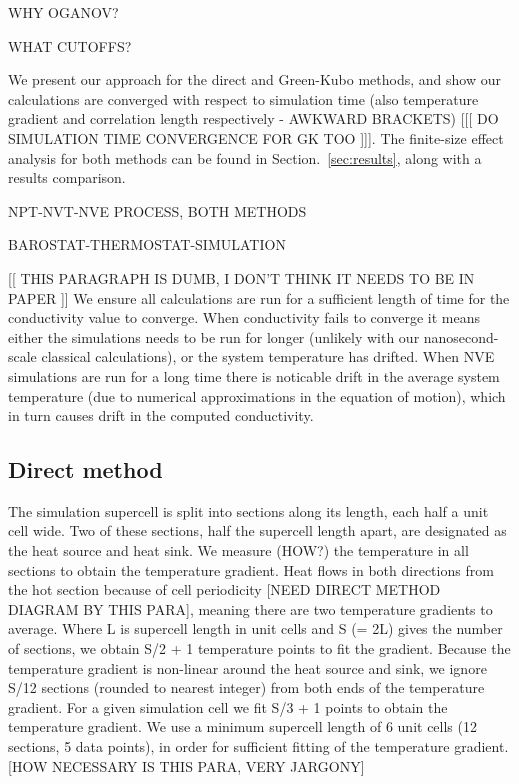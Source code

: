 \documentclass[%
preprint,                                  %
nofootinbib,
 amsmath,amssymb,
 aps,
]{revtex4-1}
\begin{document}
WHY OGANOV? 

WHAT CUTOFFS?

We present our approach for the direct and Green-Kubo methods, and show our calculations are converged with respect to simulation time (also temperature gradient and correlation length respectively - AWKWARD BRACKETS) [[[  DO SIMULATION TIME CONVERGENCE FOR GK TOO ]]]. The finite-size effect analysis for both methods can be found in Section.~\ref{sec:results}, along with a results comparison.

NPT-NVT-NVE PROCESS, BOTH METHODS

BAROSTAT-THERMOSTAT-SIMULATION

[[ THIS PARAGRAPH IS DUMB, I DON'T THINK IT NEEDS TO BE IN PAPER ]] We ensure all calculations are run for a sufficient length of time for the conductivity value to converge. When conductivity fails to converge it means either the simulations needs to be run for longer (unlikely with our nanosecond-scale classical calculations), or the system temperature has drifted. When NVE simulations are run for a long time there is noticable drift in the average system temperature (due to numerical approximations in the equation of motion), which in turn causes drift in the computed conductivity. 




\subsection{\label{sec:method.direct}Direct method}

The simulation supercell is split into sections along its length, each half a unit cell wide. Two of these sections, half the supercell length apart, are designated as the heat source and heat sink. We measure (HOW?) the temperature in all sections to obtain the temperature gradient. Heat flows in both directions from the hot section because of cell periodicity [NEED DIRECT METHOD DIAGRAM BY THIS PARA], meaning there are two temperature gradients to average. Where L is supercell length in unit cells and S (= 2L) gives the number of sections, we obtain S/2 + 1 temperature points to fit the gradient. Because the temperature gradient is non-linear around the heat source and sink, we ignore S/12 sections (rounded to nearest integer) from both ends of the temperature gradient. For a given simulation cell we fit S/3 + 1 points to obtain the temperature gradient. We use a minimum supercell length of 6 unit cells (12 sections, 5 data points), in order for sufficient fitting of the temperature gradient. [HOW NECESSARY IS THIS PARA, VERY JARGONY]
\end{document}
